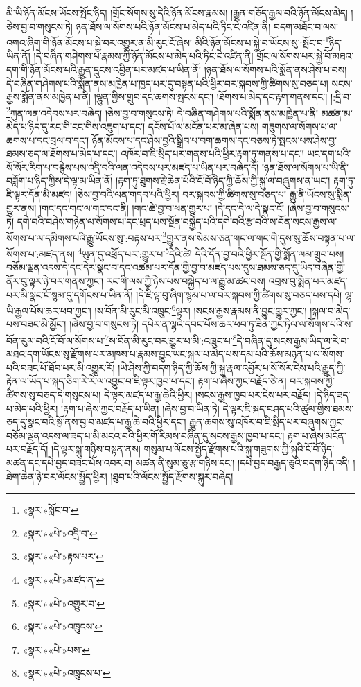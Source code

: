 མི་ཡི་ཉོན་མོངས་ཡོངས་སྤོང་ཉིད། །གྲོང་སོགས་སུ་དེའི་ཉོན་མོངས་རྣམས། །རྒྱུན་གཅོད་རྒྱལ་བའི་ཉོན་མོངས་མེད། །ཅེས་བྱ་བ་གསུངས་ཏེ། ཉན་ཐོས་ལ་སོགས་པའི་ཉོན་མོངས་པ་མེད་པའི་ཏིང་ངེ་འཛིན་ནི། བདག་མཐོང་བ་ལས་འགའ་ཞིག་གི་ཉོན་མོངས་པ་སྐྱེ་བར་འགྱུར་ན་མི་རུང་ངོ་ཞེས། མིའི་ཉོན་མོངས་པ་སྐྱེ་བ་ཡོངས་སུ་:སྤོང་བ་\footnote{«སྣར་»སློང་བ་}ཉིད་ཡིན་ནོ། །དེ་བཞིན་གཤེགས་པ་རྣམས་ཀྱི་ཉོན་མོངས་པ་མེད་པའི་ཏིང་ངེ་འཛིན་ནི། གྲོང་ལ་སོགས་པར་སྐྱེ་བོ་མཐའ་དག་གི་ཉོན་མོངས་པའི་རྒྱུན་དྲུངས་འབྱིན་པར་མཛད་པ་ཡིན་ནོ། །ཉན་ཐོས་ལ་སོགས་པའི་སྨོན་ནས་ཤེས་པ་བས། དེ་བཞིན་གཤེགས་པའི་སྨོན་ནས་མཁྱེན་པ་ཁྱད་པར་དུ་བསྟན་པའི་ཕྱིར་བར་སྐབས་ཀྱི་ཚིགས་སུ་བཅད་པ། སངས་རྒྱས་སྨོན་ནས་མཁྱེན་པ་ནི། །ལྷུན་གྱིས་གྲུབ་དང་ཆགས་སྤངས་དང་། །ཐོགས་པ་མེད་དང་རྟག་གནས་དང་། །:དྲི་བ་\footnote{«སྣར་»«པེ་»འདྲི་བ་}ཀུན་ལན་འདེབས་པར་བཞེད། །ཅེས་བྱ་བ་གསུངས་ཏེ། དེ་བཞིན་གཤེགས་པའི་སྨོན་ནས་མཁྱེན་པ་ནི། མཚན་མ་མེད་པ་ཉིད་དུ་རང་གི་ངང་གིས་འཇུག་པ་དང་། དངོས་པོ་ལ་མངོན་པར་མ་ཞེན་པས། གཟུགས་ལ་སོགས་པ་ལ་ཆགས་པ་དང་བྲལ་བ་དང་། ཉོན་མོངས་པ་དང་ཤེས་བྱའི་སྒྲིབ་པ་བག་ཆགས་དང་བཅས་ཏེ་སྤངས་པས་ཤེས་བྱ་ཐམས་ཅད་ལ་ཐོགས་པ་མེད་པ་དང་། འཁོར་བ་ཇི་སྲིད་པར་གནས་པའི་ཕྱིར་རྟག་ཏུ་གནས་པ་དང་། ཡང་དག་པའི་སོ་སོར་རིག་པ་བརྙེས་པས་འདྲི་བའི་ལན་འདེབས་པར་མཛད་པ་ཡིན་པར་བཞེད་དོ། །ཉན་ཐོས་ལ་སོགས་པ་ཡི་ནི་བཟློག་པ་ཉིད་ཀྱིས་དེ་ལྟ་མ་ཡིན་ནོ། །རྟག་ཏུ་ཐུགས་རྗེ་ཆེན་པོའི་ངོ་བོ་ཉིད་ཀྱི་ཆོས་ཀྱི་སྐུ་ལ་བཞུགས་ན་ཡང་། རྟག་ཏུ་ཇི་ལྟར་དོན་མི་མཛད། །ཅེས་བྱ་བའི་ལན་གདབ་པའི་ཕྱིར། བར་སྐབས་ཀྱི་ཚིགས་སུ་བཅད་པ། རྒྱུ་ནི་ཡོངས་སུ་སྨིན་གྱུར་ནས། །གང་དང་གང་ལ་གང་དང་ནི། །གང་ཚེ་བྱ་བ་ཕན་གྱུར་པ། །དེ་དང་དེ་ལ་དེ་སྣང་ངོ། །ཞེས་བྱ་བ་གསུངས་ཏེ། དགེ་བའི་བཤེས་གཉེན་ལ་སོགས་པ་དང་ཕྲད་པས་སྔོན་བསྐྱེད་པའི་དགེ་བའི་རྩ་བའི་ས་བོན་སངས་རྒྱས་ལ་སོགས་པ་ལ་དམིགས་པའི་རྒྱུ་ཡོངས་སུ་:བརྟས་པར་\footnote{«སྣར་»«པེ་»རྟས་པར་}གྱུར་ནས་སེམས་ཅན་གང་ལ་གང་གི་དུས་སུ་ཆོས་བསྟན་པ་ལ་སོགས་པ་:མཛད་ནས། \footnote{«སྣར་»«པེ་»མཛད་ན་}ཡུན་དུ་འཕྲོད་པར་:གྱུར་པ་\footnote{«སྣར་»«པེ་»འགྱུར་བ་}དེའི་ཚེ། དེའི་དོན་བྱ་བའི་ཕྱིར་སྔོན་གྱི་སྨོན་ལམ་གྲུབ་པས། བཅོམ་ལྡན་འདས་དེ་དང་དེར་སྣང་བ་དང་འཚམ་པར་དོན་གྱི་བྱ་བ་མཛད་པས་དུས་ཐམས་ཅད་དུ་ཡིད་བཞིན་གྱི་ནོར་བུ་ལྟར་ཉེ་བར་གནས་ཀྱང་། རང་གི་ལས་ཀྱི་ཉེས་པས་བསྐྱེད་པ་ལ་རྒྱུ་མ་ཚང་བས། འབྲས་བུ་སྨིན་པར་མཛད་པར་མི་སྣང་ངོ་སྙམ་དུ་དགོངས་པ་ཡིན་ནོ། །དེ་ཇི་ལྟ་བུ་ཞིག་སྙམ་པ་ལ་བར་སྐབས་ཀྱི་ཚིགས་སུ་བཅད་པས་དཔེ། ལྷ་ཡི་རྒྱལ་པོས་ཆར་ཕབ་ཀྱང་། །ས་བོན་མི་རུང་མི་འཁྲུང་\footnote{«སྣར་»«པེ་»འཁྲུངས་}ལྟར། །སངས་རྒྱས་རྣམས་ནི་བྱུང་གྱུར་ཀྱང་། །སྐལ་བ་མེད་པས་བཟང་མི་མྱོང་། །ཞེས་བྱ་བ་གསུངས་ཏེ། དཔེར་ན་ལྷའི་དབང་པོས་ཆར་ཕབ་ཏུ་ཟིན་ཀྱང་ཏིལ་ལ་སོགས་པའི་ས་བོན་རུལ་བའི་ངོ་བོ་ལ་སོགས་པ་\footnote{«སྣར་»«པེ་»པས་}ས་བོན་མི་རུང་བར་གྱུར་པ་མི་:འཁྲུང་པ་\footnote{«སྣར་»«པེ་»འཁྲུངས་པ་}དེ་བཞིན་དུ་སངས་རྒྱས་ཡིད་ལ་རེ་བ་མཐའ་དག་ཡོངས་སུ་རྫོགས་པར་མཁས་པ་རྣམས་བྱུང་ཡང་སྐལ་པ་མེད་པས་དམ་པའི་ཆོས་མཉན་པ་ལ་སོགས་པའི་བཟང་པོ་ཐོབ་པར་མི་འགྱུར་རོ། །ཡེ་ཤེས་ཀྱི་བདག་ཉིད་ཀྱི་ཆོས་ཀྱི་སྐུ་རྣལ་འབྱོར་པ་སོ་སོར་ངེས་པའི་རྒྱུད་ཀྱི་རྟེན་ལ་ཡོད་པ་སྐད་ཅིག་རེ་རེ་ལ་འབྱུང་བ་ཇི་ལྟར་ཁྱབ་པ་དང་། རྟག་པ་ཞེས་ཀྱང་བརྗོད་ཅེ་ན། བར་སྐབས་ཀྱི་ཚིགས་སུ་བཅད་དེ་གསུངས་པ། དེ་ལྟར་མཛད་པ་རྒྱ་ཆེའི་ཕྱིར། །སངས་རྒྱས་ཁྱབ་པར་ངེས་པར་བརྗོད། །དེ་ཉིད་ཟད་པ་མེད་པའི་ཕྱིར། །རྟག་པ་ཞེས་ཀྱང་བརྗོད་པ་ཡིན། །ཞེས་བྱ་བ་ཡིན་ཏེ། དེ་ལྟར་ཇི་སྐད་བཤད་པའི་ཚུལ་གྱིས་ཐམས་ཅད་དུ་སྣང་བའི་སྒོ་ནས་བྱ་བ་མཛད་པ་རྒྱ་ཆེ་བའི་ཕྱིར་དང་། རྒྱུན་ཆགས་སུ་འཁོར་བ་ཇི་སྲིད་པར་བཞུགས་ཀྱང་བཅོམ་ལྡན་འདས་ལ་ཟད་པ་མི་མངའ་བའི་ཕྱིར་གོ་རིམས་བཞིན་དུ་སངས་རྒྱས་ཁྱབ་པ་དང་། རྟག་པ་ཞེས་མངོན་པར་བརྗོད་དོ། །དེ་ལྟར་སྐུ་གཉིས་བསྟན་ནས། གསུམ་པ་ལོངས་སྤྱོད་རྫོགས་པའི་སྐུ་གཟུགས་ཀྱི་སྐུའི་ངོ་བོ་ཉིད་མཚན་དང་དཔེ་བྱད་བཟང་པོས་འབར་བ། མཚན་ནི་སུམ་ཅུ་རྩ་གཉིས་དང་། །དཔེ་བྱད་བརྒྱད་ཅུའི་བདག་ཉིད་འདི། །ཐེག་ཆེན་ཉེ་བར་ལོངས་སྤྱོད་ཕྱིར། །ཐུབ་པའི་ལོངས་སྤྱོད་རྫོགས་སྐུར་བཞེད། 